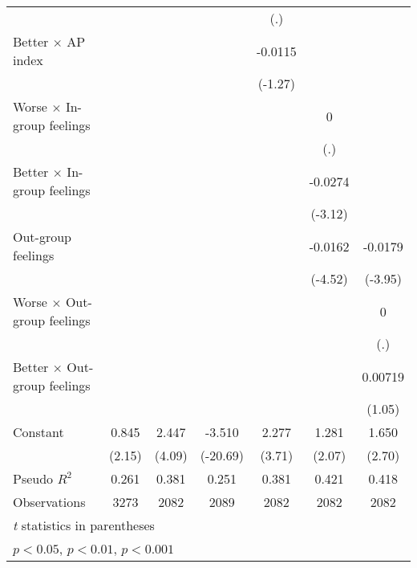 {\begin{tabular}{l*{6}{c}}
                &                  &                  &                  &      (.)         &                  &                  \\
Better $\times$ AP index&                  &                  &                  &  -0.0115         &                  &                  \\
                &                  &                  &                  &  (-1.27)         &                  &                  \\
Worse $\times$ In-group feelings&                  &                  &                  &                  &        0         &                  \\
                &                  &                  &                  &                  &      (.)         &                  \\
Better $\times$ In-group feelings&                  &                  &                  &                  &  -0.0274\sym{**} &                  \\
                &                  &                  &                  &                  &  (-3.12)         &                  \\
Out-group feelings&                  &                  &                  &                  &  -0.0162\sym{***}&  -0.0179\sym{***}\\
                &                  &                  &                  &                  &  (-4.52)         &  (-3.95)         \\
Worse $\times$ Out-group feelings&                  &                  &                  &                  &                  &        0         \\
                &                  &                  &                  &                  &                  &      (.)         \\
Better $\times$ Out-group feelings&                  &                  &                  &                  &                  &  0.00719         \\
                &                  &                  &                  &                  &                  &   (1.05)         \\
Constant        &    0.845\sym{*}  &    2.447\sym{***}&   -3.510\sym{***}&    2.277\sym{***}&    1.281\sym{*}  &    1.650\sym{**} \\
                &   (2.15)         &   (4.09)         & (-20.69)         &   (3.71)         &   (2.07)         &   (2.70)         \\
\midrule
Pseudo \(R^{2}\)&    0.261         &    0.381         &    0.251         &    0.381         &    0.421         &    0.418         \\
Observations    &     3273         &     2082         &     2089         &     2082         &     2082         &     2082         \\
\bottomrule
\multicolumn{7}{l}{\footnotesize \textit{t} statistics in parentheses}\\
\multicolumn{7}{l}{\footnotesize \sym{*} \(p<0.05\), \sym{**} \(p<0.01\), \sym{***} \(p<0.001\)}\\
\end{tabular}
}
